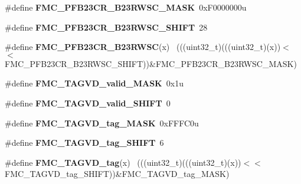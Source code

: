 \begin{DoxyCompactItemize}
\item 
\hypertarget{group___f_m_c___register___masks_ga505d7444a1ce193a572a92a3085abf09}{}\#define {\bfseries F\+M\+C\+\_\+\+P\+F\+B23\+C\+R\+\_\+\+B23\+R\+W\+S\+C\+\_\+\+M\+A\+S\+K}~0x\+F0000000u\label{group___f_m_c___register___masks_ga505d7444a1ce193a572a92a3085abf09}

\item 
\hypertarget{group___f_m_c___register___masks_gacb3db7e3c3cc06ef385e468d8a79a269}{}\#define {\bfseries F\+M\+C\+\_\+\+P\+F\+B23\+C\+R\+\_\+\+B23\+R\+W\+S\+C\+\_\+\+S\+H\+I\+F\+T}~28\label{group___f_m_c___register___masks_gacb3db7e3c3cc06ef385e468d8a79a269}

\item 
\hypertarget{group___f_m_c___register___masks_gaf5b726fdba25150deba1c2121fada854}{}\#define {\bfseries F\+M\+C\+\_\+\+P\+F\+B23\+C\+R\+\_\+\+B23\+R\+W\+S\+C}(x)                                  ~(((uint32\+\_\+t)(((uint32\+\_\+t)(x))$<$$<$F\+M\+C\+\_\+\+P\+F\+B23\+C\+R\+\_\+\+B23\+R\+W\+S\+C\+\_\+\+S\+H\+I\+F\+T))\&F\+M\+C\+\_\+\+P\+F\+B23\+C\+R\+\_\+\+B23\+R\+W\+S\+C\+\_\+\+M\+A\+S\+K)\label{group___f_m_c___register___masks_gaf5b726fdba25150deba1c2121fada854}

\item 
\hypertarget{group___f_m_c___register___masks_ga4cb93c0b6eac8e4c1d39d248ad8bf143}{}\#define {\bfseries F\+M\+C\+\_\+\+T\+A\+G\+V\+D\+\_\+valid\+\_\+\+M\+A\+S\+K}~0x1u\label{group___f_m_c___register___masks_ga4cb93c0b6eac8e4c1d39d248ad8bf143}

\item 
\hypertarget{group___f_m_c___register___masks_gad6afeb0885f0d5b21e78f96470e8843a}{}\#define {\bfseries F\+M\+C\+\_\+\+T\+A\+G\+V\+D\+\_\+valid\+\_\+\+S\+H\+I\+F\+T}~0\label{group___f_m_c___register___masks_gad6afeb0885f0d5b21e78f96470e8843a}

\item 
\hypertarget{group___f_m_c___register___masks_ga84d9df5059d93e9d8c206114912e728f}{}\#define {\bfseries F\+M\+C\+\_\+\+T\+A\+G\+V\+D\+\_\+tag\+\_\+\+M\+A\+S\+K}~0x\+F\+F\+F\+C0u\label{group___f_m_c___register___masks_ga84d9df5059d93e9d8c206114912e728f}

\item 
\hypertarget{group___f_m_c___register___masks_gae47539ff4ee56bb429932a28a2a4551b}{}\#define {\bfseries F\+M\+C\+\_\+\+T\+A\+G\+V\+D\+\_\+tag\+\_\+\+S\+H\+I\+F\+T}~6\label{group___f_m_c___register___masks_gae47539ff4ee56bb429932a28a2a4551b}

\item 
\hypertarget{group___f_m_c___register___masks_gabbc7c41cb4e1ae572c110788068f157a}{}\#define {\bfseries F\+M\+C\+\_\+\+T\+A\+G\+V\+D\+\_\+tag}(x)                                              ~(((uint32\+\_\+t)(((uint32\+\_\+t)(x))$<$$<$F\+M\+C\+\_\+\+T\+A\+G\+V\+D\+\_\+tag\+\_\+\+S\+H\+I\+F\+T))\&F\+M\+C\+\_\+\+T\+A\+G\+V\+D\+\_\+tag\+\_\+\+M\+A\+S\+K)\label{group___f_m_c___register___masks_gabbc7c41cb4e1ae572c110788068f157a}


\end{DoxyCompactItemize}
